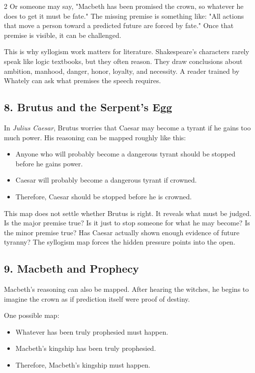 \documentclass[12pt]{article}
\begin{document}
\begin{multicols}{2}
Or someone may say, "Macbeth has been promised the crown, so whatever he does to get it must be fate." The missing premise is something like: "All actions that move a person toward a predicted future are forced by fate." Once that premise is visible, it can be challenged.

This is why syllogism work matters for literature. Shakespeare's characters rarely speak like logic textbooks, but they often reason. They draw conclusions about ambition, manhood, danger, honor, loyalty, and necessity. A reader trained by Whately can ask what premises the speech requires.

\subsection*{8. Brutus and the Serpent's Egg}
In \textit{Julius Caesar}, Brutus worries that Caesar may become a tyrant if he gains too much power. His reasoning can be mapped roughly like this:

\begin{itemize}[leftmargin=*]
\item Anyone who will probably become a dangerous tyrant should be stopped before he gains power.
\item Caesar will probably become a dangerous tyrant if crowned.
\item Therefore, Caesar should be stopped before he is crowned.
\end{itemize}

This map does not settle whether Brutus is right. It reveals what must be judged. Is the major premise true? Is it just to stop someone for what he may become? Is the minor premise true? Has Caesar actually shown enough evidence of future tyranny? The syllogism map forces the hidden pressure points into the open.

\subsection*{9. Macbeth and Prophecy}
Macbeth's reasoning can also be mapped. After hearing the witches, he begins to imagine the crown as if prediction itself were proof of destiny.

One possible map:

\begin{itemize}[leftmargin=*]
\item Whatever has been truly prophesied must happen.
\item Macbeth's kingship has been truly prophesied.
\item Therefore, Macbeth's kingship must happen.
\end{itemize}


\end{multicols}
\end{document}
